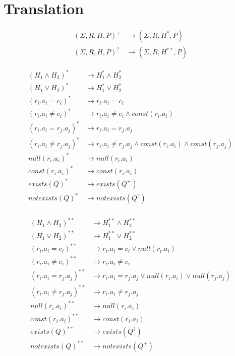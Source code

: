 \section{Translation}

\begin{align*}
	(\Sigma,R,H,P)^+ & \rightarrow (\Sigma,R,H^*,P) \\
	(\Sigma,R,H,P)^? & \rightarrow (\Sigma,R,H^{**},P) 
\end{align*}

\begin{align*}
	(H_1 \land H_2)^* & \rightarrow H_1^* \land H_2^* \\
	(H_1 \lor H_2)^* & \rightarrow H_1^* \lor H_2^* \\
	(r_i.a_i = c_i)^* & \rightarrow r_i.a_i = c_i \\
	(r_i.a_i \neq c_i)^*& \rightarrow r_i.a_i \neq c_i \land const(r_i.a_i)\\
	(r_i.a_i = r_j.a_j)^* & \rightarrow r_i.a_i = r_j.a_j \\
	(r_i.a_i \neq r_j.a_j)^* & \rightarrow r_i.a_i \neq r_j.a_j \land const(r_i.a_i) \land const(r_j.a_j)\\
	null(r_i.a_i)^* & \rightarrow null(r_i.a_i) \\
	const(r_i.a_i)^* & \rightarrow const(r_i.a_i) \\
	exists(Q)^* & \rightarrow exists(Q^+) \\
	notexists(Q)^* & \rightarrow notexists(Q^?) \\
\end{align*}

\begin{align*}
	(H_1 \land H_2)^{**} & \rightarrow H_1^{**} \land H_2^{**} \\
	(H_1 \lor H_2)^{**} & \rightarrow H_1^{**} \lor H_2^{**} \\
	(r_i.a_i = c_i)^{**} & \rightarrow r_i.a_i = c_i \lor null(r_i.a_i)\\
	(r_i.a_i \neq c_i)^{**}& \rightarrow r_i.a_i \neq c_i \\
	(r_i.a_i = r_j.a_j)^{**} & \rightarrow r_i.a_i = r_j.a_j \lor null(r_i.a_i) \lor null(r_j.a_j)\\
	(r_i.a_i \neq r_j.a_j)^{**} & \rightarrow r_i.a_i \neq r_j.a_j \\
	null(r_i.a_i)^{**} & \rightarrow null(r_i.a_i) \\
	const(r_i.a_i)^{**} & \rightarrow const(r_i.a_i) \\
	exists(Q)^{**} & \rightarrow exists(Q^?) \\
	notexists(Q)^{**} & \rightarrow notexists(Q^+) \\
\end{align*}

